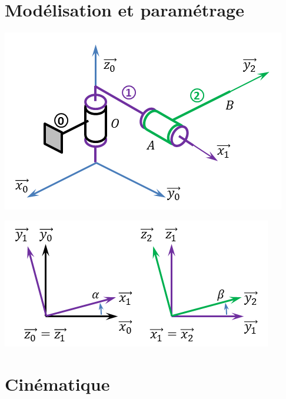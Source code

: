 \documentclass[10pt,fleqn]{article} %
\begin{document}






\section{Modélisation et paramétrage}

\begin{minipage}[c]{.47\linewidth}
\begin{center}
\includegraphics[width=\linewidth]{images/Schema}
\end{center}
\end{minipage} \hfill
\begin{minipage}[c]{.47\linewidth}
\begin{center}
\includegraphics[width=\linewidth]{images/parametrage}
\end{center}
\end{minipage}
\section{Cinématique}
\end{document}
